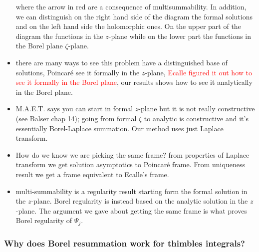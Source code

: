 \documentclass{article}
\theoremstyle{definition}
\begin{document}
\begin{itemize}
where the arrow in red are a consequence of multisummability. In addition, we can distinguish on the right hand side of the diagram the formal solutions and on the left hand side the holomorphic ones. On the upper part of the diagram the functions in the $z$-plane while on the lower part the functions in the Borel plane $\zeta$-plane.
\item  
there are many ways to see this problem have a distinguished base of solutions, Poincar\'e see it formally in the $z$-plane, \textcolor{red}{Ecalle figured it out how to see it formally in the Borel plane}, our results shows how to see it analytically in  the Borel plane.
\item  M.A.E.T. says you can start in formal $z$-plane but it is not really constructive (see Balser chap 14); going from formal $\zeta$ to analytic is constructive and it's essentially Borel-Laplace summation. Our method uses just Laplace transform. 
\item How do we know we are picking the same frame? from properties of Laplace transform we get solution asymptotics to Poincar\'e frame. From uniqueness result we get a frame equivalent to Ecalle's frame. 
\item multi-summability is a regularity result starting form the formal solution in the $z$-plane. Borel regularity is instead based on the analytic solution in the $z$-plane. The argument we gave about getting the same frame is what proves Borel regularity of $\Psi_j$.   
\end{itemize}

\color{DarkBlue}

\subsubsection{Why does Borel resummation work for thimbles integrals?}
\end{document}
